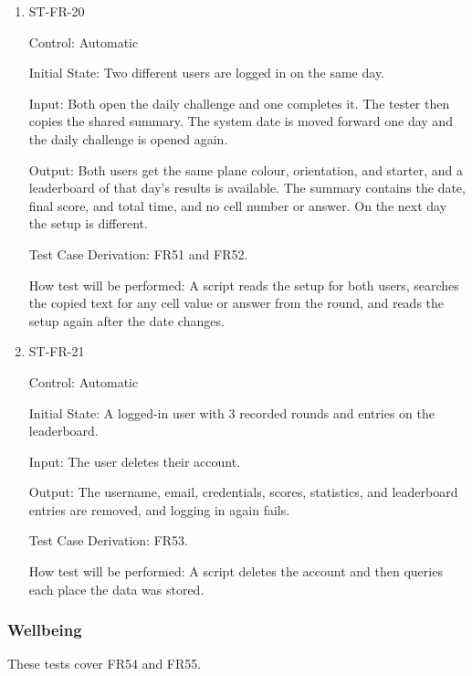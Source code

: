 \documentclass[12pt, titlepage]{article}
\begin{document}
\begin{enumerate}
How test will be performed: A script plays the rounds with a controlled timer, reads the statistics page, polls the leaderboard, and checks the records before and after the direct request.

\item{ST-FR-20\\}

Control: Automatic

Initial State: Two different users are logged in on the same day.

Input: Both open the daily challenge and one completes it. The tester then copies the shared summary. The system date is moved forward one day and the daily challenge is opened again.

Output: Both users get the same plane colour, orientation, and starter, and a leaderboard of that day's results is available. The summary contains the date, final score, and total time, and no cell number or answer. On the next day the setup is different.

Test Case Derivation: FR51 and FR52.

How test will be performed: A script reads the setup for both users, searches the copied text for any cell value or answer from the round, and reads the setup again after the date changes.

\item{ST-FR-21\\}

Control: Automatic

Initial State: A logged-in user with 3 recorded rounds and entries on the leaderboard.

Input: The user deletes their account.

Output: The username, email, credentials, scores, statistics, and leaderboard entries are removed, and logging in again fails.

Test Case Derivation: FR53.

How test will be performed: A script deletes the account and then queries each place the data was stored.

\end{enumerate}

\subsubsection{Wellbeing}

These tests cover FR54 and FR55.
\end{document}
